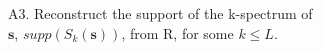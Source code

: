 \documentclass[preview]{standalone}
\begin{document}
\begin{center}
A3. Reconstruct the support of the k-spectrum of\\ $\textbf{s}$, $supp({S}_k(\textbf{s}))$, from R, for some $k \le L$.
\end{center}
\end{document}
